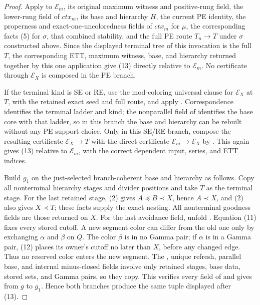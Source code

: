 \begin{proof}
Apply  to \(\mathcal E_m\), its original
maximum witness and positive-rung field, the lower-rung field of
\(\mathit{ctx}_m\), its base and hierarchy \(H\), the current PE identity,
the properness and exact-one-uncoloredness fields of
\(\mathit{ctx}_m\) for \(\mu\), the corresponding facts (5) for
\(\sigma\), that combined stability, and the full PE route
\(T_n\to T\) under \(\sigma\) constructed above.  Since the displayed
terminal tree of this invocation is the full \(T\), the corresponding
ETT, maximum witness, base, and hierarchy returned together by this one
application give (13) directly relative to \(\mathcal E_m\).  No
certificate through \(\mathcal E_X\) is composed in the PE branch.

If the terminal kind is SE or RE, use the mod-coloring universal clause
for \(\mathcal E_X\) at \(T\), with the retained exact seed and full route,
and apply .  Correspondence identifies
the terminal ladder and kind; the nonparallel field of
 identifies the base core with that ladder, so in
this branch the base and hierarchy can be rebuilt without any PE support
choice.  Only in this SE/RE branch, compose the resulting certificate
\(\mathcal E_X\to T\) with the direct certificate
\(\mathcal E_m\to\mathcal E_X\) by
.  This again gives (13)
relative to \(\mathcal E_m\), with the correct dependent input, series,
and ETT indices.

Build \(g_1\) on the just-selected branch-coherent base and hierarchy as
follows.  Copy all nonterminal hierarchy stages and divider positions and
take \(T\) as the terminal stage.  For the last retained stage, (2) gives
\(A\preccurlyeq B\prec X\), hence \(A\prec X\), and (2) also gives
\(X\prec T\); these facts supply the exact nesting.  All nonterminal
goodness fields are those returned on \(X\).  For the last
avoidance field, unfold .  Equation
(11) fixes every stored cutoff.  A new segment color can differ from the
old one only by exchanging \(\alpha\) and \(\beta\) on \(Q\).  The color
\(\beta\) is in no Gamma pair; if \(\alpha\) is in a Gamma pair, (12)
places its owner's cutoff no later than \(X\), before any changed edge.
Thus no reserved color enters the new segment.  The
, unique refresh, parallel base, and
internal minus-closed fields involve only retained stages, base data,
stored sets, and Gamma pairs, so they copy.  This verifies every field of
 and gives
 from \(g\) to \(g_1\).  Hence both branches
produce the same tuple displayed after (13).


\end{proof}

